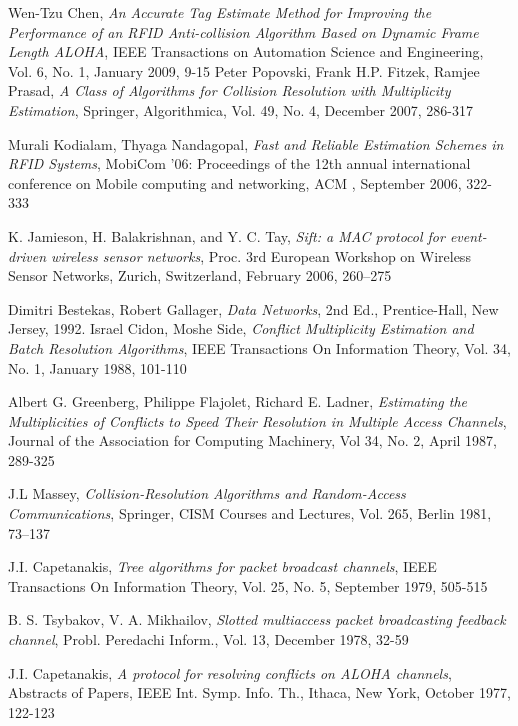 \begin{thebibliography}{99}
 
 Wen-Tzu Chen, \emph{An Accurate Tag Estimate Method for Improving the Performance of an RFID Anti-collision Algorithm Based on Dynamic Frame Length ALOHA}, IEEE Transactions on Automation Science and Engineering, Vol. 6, No. 1, January 2009, 9-15
  Peter Popovski, Frank H.P. Fitzek, Ramjee Prasad, \emph{ A Class of Algorithms for Collision Resolution with Multiplicity Estimation}, Springer, Algorithmica, Vol. 49, No. 4, December 2007, 286-317
  
Murali Kodialam, Thyaga Nandagopal, \emph{Fast and Reliable Estimation Schemes in RFID Systems}, MobiCom '06: Proceedings of the 12th annual international conference on Mobile computing and networking, ACM , September 2006, 322-333 
 
K. Jamieson, H. Balakrishnan, and Y. C. Tay, \emph{Sift: a MAC protocol for event-driven wireless sensor networks},  Proc. 3rd European Workshop on Wireless Sensor Networks, Zurich, Switzerland, February 2006, 260–275 

Dimitri Bestekas, Robert Gallager, \emph{Data Networks}, 2nd Ed., Prentice-Hall, New Jersey, 1992.
 Israel Cidon, Moshe Side, \emph{Conflict Multiplicity Estimation and Batch Resolution Algorithms}, IEEE Transactions On Information Theory, Vol. 34, No. 1, January 1988, 101-110
 
  Albert G. Greenberg, Philippe Flajolet,  Richard E. Ladner,
  \emph{Estimating the Multiplicities of Conflicts to Speed Their Resolution in Multiple Access Channels},
  Journal of the Association for Computing Machinery,
  Vol 34, No. 2, April 1987, 289-325
 
  J.L Massey, \emph{Collision-Resolution Algorithms and Random-Access Communications}, Springer, CISM Courses and Lectures, Vol. 265, Berlin 1981, 73–137
  
  J.I. Capetanakis, \emph{ Tree algorithms for packet broadcast channels}, IEEE Transactions On Information Theory, Vol. 25, No. 5, September 1979, 505-515
 
B. S. Tsybakov, V. A. Mikhailov, \emph{Slotted multiaccess packet broadcasting feedback channel}, Probl. Peredachi Inform., Vol. 13, December 1978, 32-59
 
J.I. Capetanakis, \emph{A protocol for resolving conflicts on ALOHA channels}, Abstracts of Papers, IEEE Int. Symp. Info. Th., Ithaca, New York, October 1977, 122-123

 \end{thebibliography}
 
